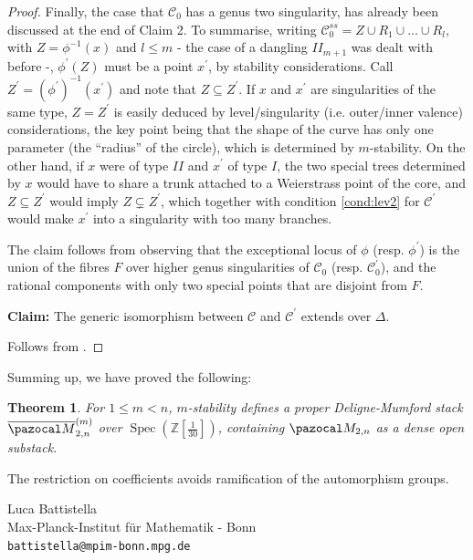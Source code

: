 \documentclass[11pt]{amsart}
\newcommand{\oM}{\overline{\pazocal M}}
\newcommand{\dvr}{\Delta}
\theoremstyle{plain}
\newtheorem{thm}{Theorem}[section]
\theoremstyle{definition}
\begin{document}
\begin{proof}
 Finally, the case that $\mathcal C_0$ has a genus two singularity, has already been discussed at the end of Claim 2. To summarise, writing $\mathcal C^{ss}_0=Z\cup R_1\cup\ldots\cup R_l$, with $Z=\phi^{-1}(x)$ and $l\leq m$ - the case of a dangling $I\!I_{m+1}$ was dealt with before -, $\phi^\prime(Z)$ must be a point $x^\prime$, by stability considerations. Call $Z^\prime=(\phi^\prime)^{-1}(x^\prime)$ and note that $Z\subseteq Z^\prime$. If $x$ and $x^\prime$ are singularities of the same type, $Z=Z^\prime$ is easily deduced by level/singularity (i.e. outer/inner valence) considerations, the key point being that the shape of the curve has only one parameter (the ``radius'' of the circle), which is determined by $m$-stability. On the other hand, if $x$ were of type $I\!I$ and $x^\prime$ of type $I$, the two special trees determined by $x$ would have to share a trunk attached to a Weierstrass point of the core, and $Z\subseteq Z^\prime$ would imply $Z\subsetneq Z^\prime$, which together with condition \eqref{cond:lev2} for $\mathcal C^\prime$ would make $x^\prime$ into a singularity with too many branches.
 
 The claim follows from observing that the exceptional locus of $\phi$ (resp. $\phi^\prime$) is the union of the fibres $F$ over higher genus singularities of $\mathcal C_0$ (resp. $\mathcal C_0^\prime$), and the rational components with only two special points that are disjoint from $F$.
 
 \textbf{Claim:} The generic isomorphism between $\mathcal C$ and $\mathcal C^\prime$ extends over $\dvr$.
 
 Follows from \cite[Lemma 1.13]{Debarre}.
\end{proof}

Summing up, we have proved the following:
\begin{thm}
 For $1\leq m <n$, $m$-stability defines a proper Deligne-Mumford stack $\oM_{2,n}^{(m)}$ over $\operatorname{Spec}(\mathbb Z[\frac{1}{30}])$, containing $\pazocal M_{2,n}$ as a dense open substack.
\end{thm}
 The restriction on coefficients avoids ramification of the automorphism groups.






\medskip

\noindent Luca Battistella\\
Max-Planck-Institut f\"ur Mathematik - Bonn \\
\texttt{battistella@mpim-bonn.mpg.de}\\
\end{document}

